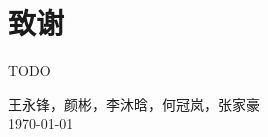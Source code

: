 
\chapter{致谢}
	TODO
	

\vskip 108pt
\begin{flushright}
	王永锋，颜彬，李沐晗，何冠岚，张家豪\makebox[1cm]{} \\
\today
\end{flushright}

